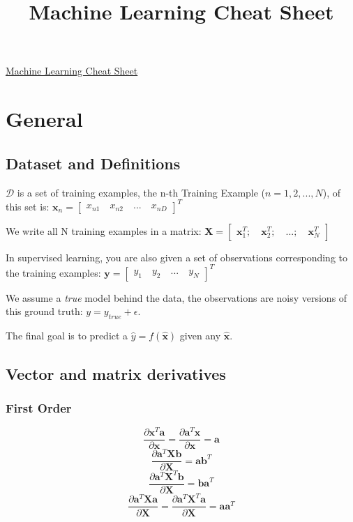 \documentclass[10pt,a4paper,landscape]{article}
\renewcommand{\bf}[1]{\ensuremath{\mathbf{#1}}}
\begin{document}
\title{Machine Learning Cheat Sheet}

\raggedright
\footnotesize
\sffamily
\begin{multicols*}{4}

\setlength{\premulticols}{1pt}
\setlength{\postmulticols}{1pt}
\setlength{\multicolsep}{1pt}
\setlength{\columnsep}{2pt}

\begin{center}
\Large{\underline{Machine Learning Cheat Sheet}}
\end{center}

\section{General}
\subsection{Dataset and Definitions}
$\mathcal{D}$ is a set of training examples, the n-th Training Example ($n = 1,2, ..., N$), of this set is: $\bf{x}_n = \begin{bmatrix} x_{n1} \quad x_{n2} \quad ... \quad x_{nD} \end{bmatrix}^T$

We write all N training examples in a matrix: $\bf{X} = \begin{bmatrix} \bf{x}_1^T ; \quad \bf{x}_2^T ; \quad ... ; \quad \bf{x}_N^T \end{bmatrix}$

In supervised learning, you are also given a set of observations corresponding to the training examples:  $\bf{y} = \begin{bmatrix} y_1 \quad y_2 \quad ... \quad y_{N} \end{bmatrix}^T$

We assume a \emph{true} model behind the data, the observations are noisy versions of this ground truth: $y = y_{true} + \epsilon$.

The final goal is to predict a $\hat{y} = f(\bf{\hat{x}})$ given any $\bf{\hat{x}}$.

\subsection{Vector and matrix derivatives}
\subsubsection{First Order}
$$\frac{\partial\bf{x}^T\bf{a}}{\partial\bf{x}} = \frac{\partial\bf{a}^T\bf{x}}{\partial\bf{x}} = \bf{a}$$
$$\frac{\partial\bf{a}^T\bf{X}\bf{b}}{\partial\bf{X}} = \bf{ab}^T$$
$$\frac{\partial\bf{a}^T\bf{X}^T\bf{b}}{\partial\bf{X}} = \bf{ba}^T$$
$$\frac{\partial\bf{a}^T\bf{Xa}}{\partial\bf{X}} = \frac{\partial\bf{a}^T\bf{X}^T\bf{a}}{\partial\bf{X}} = \bf{aa}^T$$

\end{multicols*}
\end{document}
